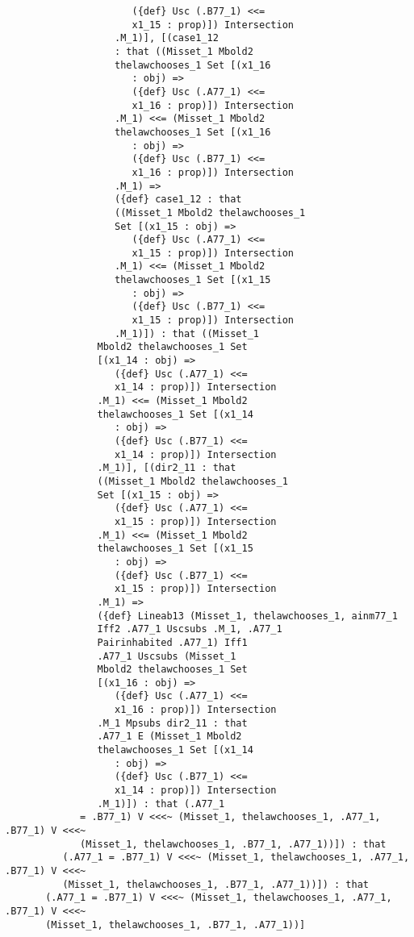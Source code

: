 \documentclass[12pt]{article}
\begin{document}
\begin{verbatim}
                      ({def} Usc (.B77_1) <<= 
                      x1_15 : prop)]) Intersection 
                   .M_1)], [(case1_12 
                   : that ((Misset_1 Mbold2 
                   thelawchooses_1 Set [(x1_16 
                      : obj) => 
                      ({def} Usc (.A77_1) <<= 
                      x1_16 : prop)]) Intersection 
                   .M_1) <<= (Misset_1 Mbold2 
                   thelawchooses_1 Set [(x1_16 
                      : obj) => 
                      ({def} Usc (.B77_1) <<= 
                      x1_16 : prop)]) Intersection 
                   .M_1) => 
                   ({def} case1_12 : that 
                   ((Misset_1 Mbold2 thelawchooses_1 
                   Set [(x1_15 : obj) => 
                      ({def} Usc (.A77_1) <<= 
                      x1_15 : prop)]) Intersection 
                   .M_1) <<= (Misset_1 Mbold2 
                   thelawchooses_1 Set [(x1_15 
                      : obj) => 
                      ({def} Usc (.B77_1) <<= 
                      x1_15 : prop)]) Intersection 
                   .M_1)]) : that ((Misset_1 
                Mbold2 thelawchooses_1 Set 
                [(x1_14 : obj) => 
                   ({def} Usc (.A77_1) <<= 
                   x1_14 : prop)]) Intersection 
                .M_1) <<= (Misset_1 Mbold2 
                thelawchooses_1 Set [(x1_14 
                   : obj) => 
                   ({def} Usc (.B77_1) <<= 
                   x1_14 : prop)]) Intersection 
                .M_1)], [(dir2_11 : that 
                ((Misset_1 Mbold2 thelawchooses_1 
                Set [(x1_15 : obj) => 
                   ({def} Usc (.A77_1) <<= 
                   x1_15 : prop)]) Intersection 
                .M_1) <<= (Misset_1 Mbold2 
                thelawchooses_1 Set [(x1_15 
                   : obj) => 
                   ({def} Usc (.B77_1) <<= 
                   x1_15 : prop)]) Intersection 
                .M_1) => 
                ({def} Lineab13 (Misset_1, thelawchooses_1, ainm77_1 
                Iff2 .A77_1 Uscsubs .M_1, .A77_1 
                Pairinhabited .A77_1) Iff1 
                .A77_1 Uscsubs (Misset_1 
                Mbold2 thelawchooses_1 Set 
                [(x1_16 : obj) => 
                   ({def} Usc (.A77_1) <<= 
                   x1_16 : prop)]) Intersection 
                .M_1 Mpsubs dir2_11 : that 
                .A77_1 E (Misset_1 Mbold2 
                thelawchooses_1 Set [(x1_14 
                   : obj) => 
                   ({def} Usc (.B77_1) <<= 
                   x1_14 : prop)]) Intersection 
                .M_1)]) : that (.A77_1 
             = .B77_1) V <<<~ (Misset_1, thelawchooses_1, .A77_1, .B77_1) V <<<~ 
             (Misset_1, thelawchooses_1, .B77_1, .A77_1))]) : that 
          (.A77_1 = .B77_1) V <<<~ (Misset_1, thelawchooses_1, .A77_1, .B77_1) V <<<~ 
          (Misset_1, thelawchooses_1, .B77_1, .A77_1))]) : that 
       (.A77_1 = .B77_1) V <<<~ (Misset_1, thelawchooses_1, .A77_1, .B77_1) V <<<~ 
       (Misset_1, thelawchooses_1, .B77_1, .A77_1))]


\end{verbatim}
\end{document}
